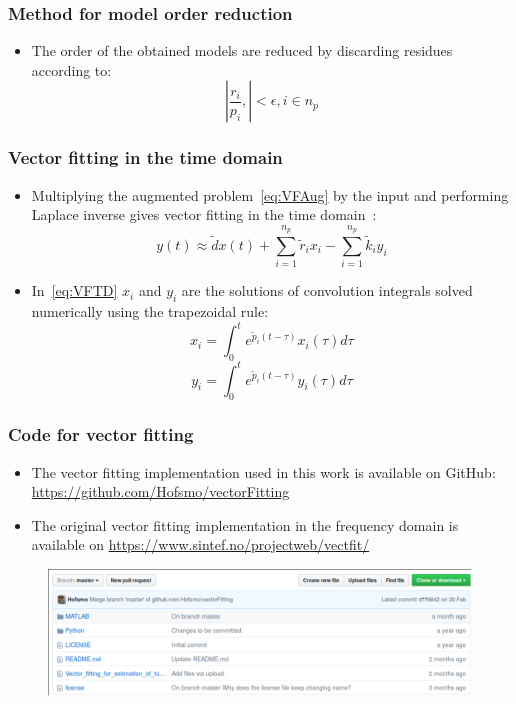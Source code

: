 \begin{frame}
	\frametitle{Method for model order reduction}
	\begin{itemize}
		\item The order of the obtained models are reduced by discarding residues according to:
\begin{equation}
    \label{eq:VFResidues}
    |\frac{{r}_i}{p_i},| < \epsilon, i \in n_p
\end{equation}
\end{itemize}
\end{frame}
\begin{frame}
	\frametitle{Vector fitting in the time domain}
	\begin{itemize}
		\item<1-> Multiplying the augmented problem~\eqref{eq:VFAug} by the input and performing Laplace inverse gives vector fitting in the time domain~\cite{grivet-talocia_package_2003}:
\begin{equation}
    \label{eq:VFTD}
    y(t) \approx \tilde{d} x(t) + \sum^{n_p}_{i=1} \tilde{r}_ix_i-\sum^{n_p}_{i=1}\tilde{k}_iy_i
\end{equation}
		\item<2-> In~\eqref{eq:VFTD} $x_i$ and $y_i$ are the solutions of convolution integrals solved numerically using the trapezoidal rule:
\begin{equation}
    \label{eq:XVFWave}
    x_i = \int^t_0 e^{\tilde{p}_i(t-\tau)}x_i(\tau)d\tau
\end{equation}
\begin{equation}
    \label{eq:YVFWave}
    y_i = \int^t_0 e^{\tilde{p}_{i}(t-\tau)}y_i(\tau)d\tau
\end{equation}

	\end{itemize}
\end{frame}
\begin{frame}
	\frametitle{Code for vector fitting}
	\begin{itemize}
		\item<1-> The vector fitting implementation used in this work is available on GitHub: \url{https://github.com/Hofsmo/vectorFitting}
		\item<2-> The original vector fitting implementation in the frequency domain is available on \url{https://www.sintef.no/projectweb/vectfit/}
	\end{itemize}
	\begin{figure}[b]
		\includegraphics[width=\textwidth]{pictures/git.pdf}
	\end{figure}
\end{frame}
